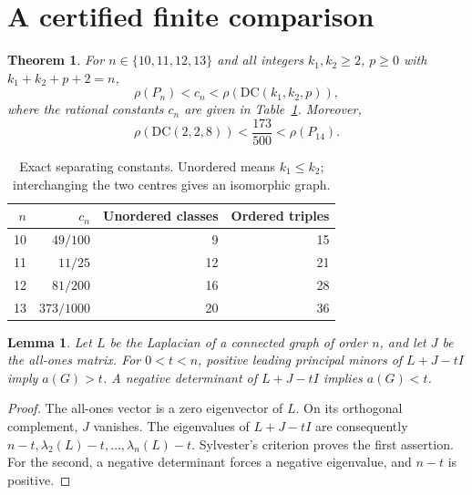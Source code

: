 \documentclass[11pt]{article}
\newtheorem{theorem}{Theorem}
\newtheorem{lemma}{Lemma}
\newcommand{\DC}{\mathrm{DC}}
\newcommand{\ra}{\rho}
\begin{document}
\section{A certified finite comparison}
\begin{theorem}\label{thm:main}
For $n\in\{10,11,12,13\}$ and all integers $k_1,k_2\ge2$, $p\ge0$ with
$k_1+k_2+p+2=n$,
\[
 \ra(P_n)<c_n<\ra(\DC(k_1,k_2,p)),
\]
where the rational constants $c_n$ are given in Table~\ref{tab:bounds}.
Moreover,
\[
 \ra(\DC(2,2,8))<\frac{173}{500}<\ra(P_{14}).
\]
\end{theorem}

\begin{table}[ht]
\centering
\begin{tabular}{rrrr}
\toprule
$n$ & $c_n$ & Unordered classes & Ordered triples\\
\midrule
10 & $49/100$ & 9 & 15\\
11 & $11/25$ & 12 & 21\\
12 & $81/200$ & 16 & 28\\
13 & $373/1000$ & 20 & 36\\
\bottomrule
\end{tabular}
\caption{Exact separating constants. Unordered means $k_1\le k_2$;
interchanging the two centres gives an isomorphic graph.}\label{tab:bounds}
\end{table}

\begin{lemma}\label{lem:sign}
Let $L$ be the Laplacian of a connected graph of order $n$, and let $J$
be the all-ones matrix. For $0<t<n$, positive leading principal minors
of $L+J-tI$ imply $a(G)>t$. A negative determinant of $L+J-tI$ implies
$a(G)<t$.
\end{lemma}
\begin{proof}
The all-ones vector is a zero eigenvector of $L$. On its orthogonal
complement, $J$ vanishes. The eigenvalues of $L+J-tI$ are consequently
$n-t,\lambda_2(L)-t,\ldots,\lambda_n(L)-t$.
Sylvester's criterion proves the first assertion. For the second, a
negative determinant forces a negative eigenvalue, and $n-t$ is positive.
\end{proof}
\end{document}
